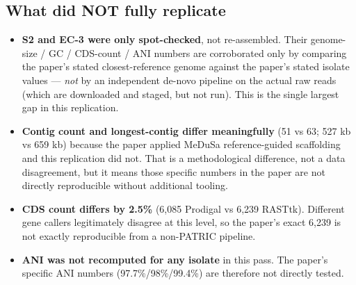 \documentclass[11pt]{article}
\begin{document}
\subsection*{What did NOT fully replicate}
\begin{itemize}
\item \textbf{S2 and EC-3 were only spot-checked}, not re-assembled. Their genome-size / GC / CDS-count / ANI numbers are corroborated only by comparing the paper's stated closest-reference genome against the paper's stated isolate values --- \emph{not} by an independent de-novo pipeline on the actual raw reads (which are downloaded and staged, but not run). This is the single largest gap in this replication.
\item \textbf{Contig count and longest-contig differ meaningfully} (51 vs 63; 527 kb vs 659 kb) because the paper applied MeDuSa reference-guided scaffolding and this replication did not. That is a methodological difference, not a data disagreement, but it means those specific numbers in the paper are not directly reproducible without additional tooling.
\item \textbf{CDS count differs by 2.5\%} (6{,}085 Prodigal vs 6{,}239 RASTtk). Different gene callers legitimately disagree at this level, so the paper's exact 6{,}239 is not exactly reproducible from a non-PATRIC pipeline.
\item \textbf{ANI was not recomputed for any isolate} in this pass. The paper's specific ANI numbers (97.7\%/98\%/99.4\%) are therefore not directly tested.
\end{itemize}
\end{document}
